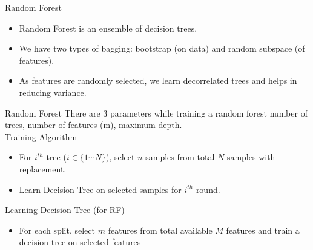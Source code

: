 \documentclass{beamer}
\begin{document}
\begin{frame}{Random Forest}
  \begin{itemize}
    \item Random Forest is an ensemble of decision trees.
    \item We have two types of bagging: bootstrap (on data) and random subspace (of features).
    \item As features are randomly selected, we learn decorrelated trees and helps in reducing variance.
  \end{itemize}
\end{frame}

\begin{frame}{Random Forest}
There are 3 parameters while training a random forest number of trees, number of features (m), maximum depth.\\
\vspace{1cm}
\underline{Training Algorithm}\\
\begin{itemize}
	\item For $i^{th}$ tree ($i \in \{1 \cdots N\}$), select $n$ samples from total $N$ samples with replacement.\\
		
		\item Learn Decision Tree on selected samples for $i^{th}$ round.
		 

\end{itemize}

\underline{Learning Decision Tree (for RF)}\\
\begin{itemize}
	\item For each split, select $m$ features from total available $M$ features and train a decision tree on selected features
\end{itemize}


\end{frame}

	

\end{document}
